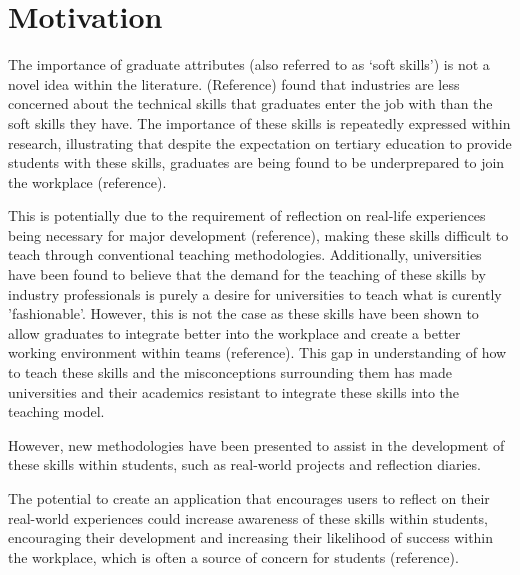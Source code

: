 \documentclass{l4proj}
\begin{document}
\section{Motivation}
The importance of graduate attributes (also referred to as ‘soft skills’) is not a 
novel idea within the literature. (Reference) found that industries are less concerned
about the technical skills that graduates enter the job with than the soft skills they have.
The importance of these skills is repeatedly expressed within research, illustrating that 
despite the expectation on tertiary education to provide students 
with these skills, graduates are being found to be underprepared to join the workplace 
(reference). 
\par 
This is potentially due to the requirement of reflection on real-life experiences 
being necessary for major development (reference), making these skills difficult to teach
through conventional teaching methodologies. Additionally, universities have been found to
believe that the demand for the teaching of these skills by industry professionals is 
purely a desire for universities to teach what is curently 'fashionable'. However, this
is not the case as these skills have been shown to allow graduates to integrate better 
into the workplace and create a better working environment within teams (reference).
This gap in understanding of how to teach these skills and the misconceptions surrounding
them has made universities and their academics resistant to integrate these skills into 
the teaching model. 
\par 
However, new methodologies have been presented 
to assist in the development of these skills within students, such as real-world 
projects and reflection diaries.
\par 
The potential to create an application that encourages users to reflect on their 
real-world experiences could increase awareness of these skills within students, 
encouraging their development and increasing their likelihood of success within the 
workplace, which is often a source of concern for students (reference).
\end{document}
